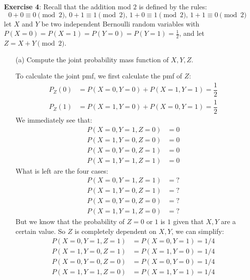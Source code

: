 \documentclass{article}
\begin{document}
\newpage

\textbf{Exercise 4}: Recall that the addition mod $2$ is defined by the rules:
    \begin{equation*}
        0 + 0 \equiv 0 \pmod{2}, \, 0 + 1 \equiv 1 \pmod{2}, \, 1 + 0 \equiv 1 \pmod{2}, \, 1 + 1 \equiv 0 \pmod{2}
    \end{equation*}
let $X$ and $Y$ be two independent Bernoulli random variables with $P(X = 0) = P(X = 1) = P(Y = 0) = P(Y = 1) = \frac{1}{2}$, and let $Z = X + Y \pmod{2}$. 
    \begin{itemize}
        \item [(a)] Compute the joint probability mass function of $X, Y, Z$.
            \begin{answer}
                To calculate the joint pmf, we first calculate the pmf of $Z$:
                    \begin{align*}
                        P_{Z}(0) &= P(X = 0, Y = 0) + P(X = 1, Y = 1) = \dfrac{1}{2} \\
                        P_{Z}(1) &= P(X = 1, Y = 0) + P(X = 0, Y = 1) = \dfrac{1}{2}
                    \end{align*}
                We immediately see that:
                    \begin{align*}
                        P(X = 0, Y = 1, Z = 0) &= 0 \\
                        P(X = 1, Y = 0, Z = 0) &= 0 \\
                        P(X = 0, Y = 0, Z = 1) &= 0 \\
                        P(X = 1, Y = 1, Z = 1) &= 0   
                    \end{align*}
                What is left are the four cases:
                    \begin{align*}
                        P(X = 0, Y = 1, Z = 1) &= ? \\
                        P(X = 1, Y = 0, Z = 1) &= ? \\
                        P(X = 0, Y = 0, Z = 0) &= ? \\
                        P(X = 1, Y = 1, Z = 0) &= ?   
                    \end{align*}
                But we know that the probability of $Z = 0$ or $1$ is $1$ given that $X, Y$ are a certain value. So $Z$ is completely dependent on $X, Y$, we can simplify:
                    \begin{align*}
                        P(X = 0, Y = 1, Z = 1) &= P(X = 0, Y = 1) = 1/4 \\
                        P(X = 1, Y = 0, Z = 1) &= P(X = 1, Y = 0) = 1/4 \\
                        P(X = 0, Y = 0, Z = 0) &= P(X = 0, Y = 0) = 1/4 \\
                        P(X = 1, Y = 1, Z = 0) &= P(X = 1, Y = 1) = 1/4   
                    \end{align*}
            \end{answer}


\end{itemize}
\end{document}
